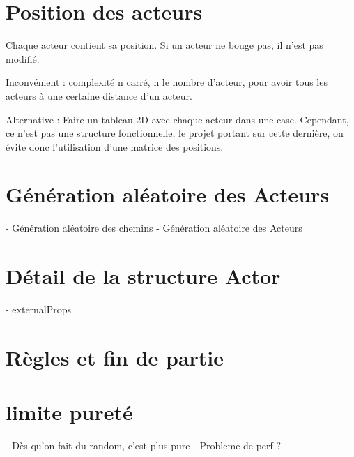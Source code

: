 \documentclass{article}
\begin{document}
\section{Position des acteurs}
Chaque acteur contient sa position.
Si un acteur ne bouge pas, il n'est pas modifié.

Inconvénient : complexité n carré, n le nombre d'acteur, pour avoir tous les acteurs à une certaine distance d'un acteur.

Alternative : Faire un tableau 2D avec chaque acteur dans une case. Cependant, ce n'est pas une structure fonctionnelle, 
le projet portant sur cette dernière, on évite donc l'utilisation d'une matrice des positions.

\section{Génération aléatoire des Acteurs}
- Génération aléatoire des chemins
- Génération aléatoire des Acteurs

\section{Détail de la structure Actor}
- externalProps

\section{Règles et fin de partie}

\section{limite pureté}
- Dès qu'on fait du random, c'est plus pure
- Probleme de perf ?
\end{document}
